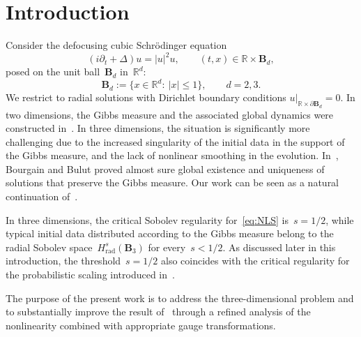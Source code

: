 \documentclass[11pt,reqno,english]{amsart}
\numberwithin{equation}{section}
\theoremstyle{plain}
\theoremstyle{definition}
\theoremstyle{remark}
\newcommand{\R}{\mathbb{R}}
\begin{document}
	\section{Introduction}
Consider the defocusing cubic Schrödinger equation
\begin{equation}
	\label{eq:NLS}
	\tag{NLS}
	(i\partial_{t}+ \Delta)u = |u|^{2}u, \qquad (t,x)\in \R\times \mathbf{B}_{d},
\end{equation}
posed on the unit ball~$\mathbf{B}_{d}$ in~$\R^{d}$:
\[
\mathbf{B}_{d}:=\{x\in\R^{d}:\ |x|\leq 1\}, \qquad d=2,3.
\]
We restrict to radial solutions with Dirichlet boundary conditions
$
u|_{\R\times \partial\mathbf{B}_{d}}=0.
$
In two dimensions, the Gibbs measure and the associated global dynamics were constructed in~\cite{Tzv08}.
In three dimensions, the situation is significantly more challenging due to the increased singularity of the initial data in the support of the Gibbs measure, and the lack of nonlinear smoothing in the evolution. In~\cite{BB14}, Bourgain and Bulut proved almost sure global existence and uniqueness of solutions that preserve the Gibbs measure. Our work can be seen as a natural continuation of~\cite{Tzv08,BB14}.

In three dimensions, the critical Sobolev regularity for~\eqref{eq:NLS} is~$s=1/2$, while typical initial data distributed according to the Gibbs measure belong to the radial Sobolev space~$H_{\mathrm{rad}}^{s}(\mathbf{B}_{3})$ for every~$s<1/2$. As discussed later in this introduction, the threshold~$s=1/2$ also coincides with the critical regularity for the probabilistic scaling introduced in~\cite{DNY24,DNY22}.

The purpose of the present work is to address the three-dimensional problem and to substantially improve the result of~\cite{BB14} through a refined analysis of the nonlinearity combined with appropriate gauge transformations.
\end{document}
